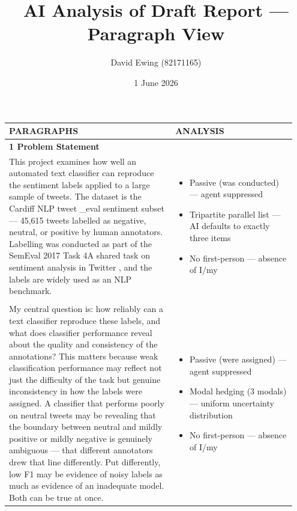 \documentclass[11pt]{article}
\title{AI Analysis of Draft Report --- Paragraph View}
\author{David Ewing (82171165)}
\date{1 June 2026}
\begin{document}
\maketitle
\thispagestyle{empty}
\newpage

\setlength{\LTleft}{0pt}
\setlength{\LTright}{0pt}
\begin{longtable}{|p{0.55\linewidth}|p{0.40\linewidth}|}
\hline
\centering\textbf{PARAGRAPHS} & \centering\textbf{ANALYSIS} \tabularnewline[2pt]
\hline
\endhead
\textbf{1 Problem Statement}\\[4pt]
This project examines how well an automated text classifier can reproduce the sentiment labels applied to a large sample of tweets. The dataset is the Cardiff NLP tweet \_eval sentiment subset --- 45,615 tweets labelled as negative, neutral, or positive by human annotators. Labelling was conducted as part of the SemEval 2017 Task 4A shared task on sentiment analysis in Twitter , and the labels are widely used as an NLP benchmark. & \begin{itemize}[leftmargin=1em,itemsep=1pt,topsep=1pt,parsep=0pt]
  \item Passive (was conducted) --- agent suppressed
  \item Tripartite parallel list --- AI defaults to exactly three items
  \item No first-person --- absence of I/my
\end{itemize} \\[2pt]
\hline
\rule{0pt}{3.5cm} & \\
\hline
My central question is: how reliably can a text classifier reproduce these labels, and what does classifier performance reveal about the quality and consistency of the annotations? This matters because weak classification performance may reflect not just the difficulty of the task but genuine inconsistency in how the labels were assigned. A classifier that performs poorly on neutral tweets may be revealing that the boundary between neutral and mildly positive or mildly negative is genuinely ambiguous --- that different annotators drew that line differently. Put differently, low F1 may be evidence of noisy labels as much as evidence of an inadequate model. Both can be true at once. & \begin{itemize}[leftmargin=1em,itemsep=1pt,topsep=1pt,parsep=0pt]
  \item Passive (were assigned) --- agent suppressed
  \item Modal hedging (3 modals) --- uniform uncertainty distribution
  \item No first-person --- absence of I/my

\end{itemize}
\end{longtable}
\end{document}
